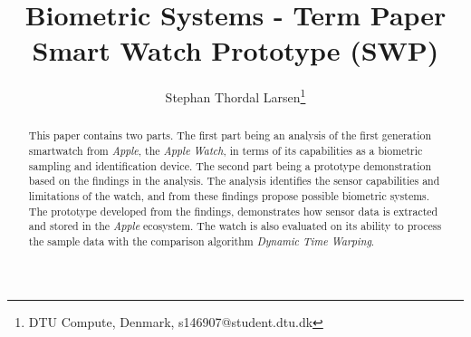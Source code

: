 \documentclass[english]{lni}
\author{Stephan Thordal Larsen\footnote{DTU Compute, Denmark,
s146907@student.dtu.dk}}
\title{Biometric Systems - Term Paper \\ Smart Watch Prototype (SWP)}
\renewcommand{\headrulewidth}{0.4pt} %
\begin{document}
\maketitle

\renewcommand{\refname}{References}
\setcounter{footnote}{1} %

\begin{abstract}
This paper contains two parts. The first part being an analysis of the first generation 
smartwatch from \textit{Apple}, the \textit{Apple Watch}, in terms of its
capabilities as a biometric sampling and identification device. The second part
being a prototype demonstration based on the findings in the analysis. 
The analysis identifies the sensor capabilities and limitations of the watch, 
and from these findings propose possible biometric systems. 
The prototype developed from the findings, demonstrates how sensor data is
extracted and stored in the \textit{Apple} ecosystem. The watch is also
evaluated on its ability to process the sample data with the comparison
algorithm \textit{Dynamic Time Warping}. 
\end{abstract}



\clearpage
\pagestyle{fancy}
\fancyhead{} %
\fancyfoot{} %
\renewcommand{\headrulewidth}{0.4pt} %





%

\end{document}
